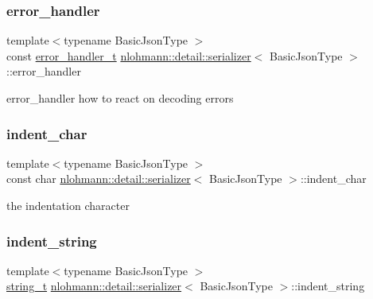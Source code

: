 \subsubsection{\texorpdfstring{error\_handler}{error\_handler}}
{\footnotesize\ttfamily template$<$typename Basic\+Json\+Type $>$ \\
const \mbox{\hyperlink{namespacenlohmann_1_1detail_a5a76b60b26dc8c47256a996d18d967df}{error\+\_\+handler\+\_\+t}} \mbox{\hyperlink{classnlohmann_1_1detail_1_1serializer}{nlohmann\+::detail\+::serializer}}$<$ Basic\+Json\+Type $>$\+::error\+\_\+handler\hspace{0.3cm}{\ttfamily [private]}}



error\+\_\+handler how to react on decoding errors 

\mbox{\label{classnlohmann_1_1detail_1_1serializer_a9a55e6b028d09676fe35aefa0c72ea5b}} 
\subsubsection{\texorpdfstring{indent\_char}{indent\_char}}
{\footnotesize\ttfamily template$<$typename Basic\+Json\+Type $>$ \\
const char \mbox{\hyperlink{classnlohmann_1_1detail_1_1serializer}{nlohmann\+::detail\+::serializer}}$<$ Basic\+Json\+Type $>$\+::indent\+\_\+char\hspace{0.3cm}{\ttfamily [private]}}



the indentation character 

\mbox{\label{classnlohmann_1_1detail_1_1serializer_ae9268a10d88a5526e32735a55a132fc6}} 
\subsubsection{\texorpdfstring{indent\_string}{indent\_string}}
{\footnotesize\ttfamily template$<$typename Basic\+Json\+Type $>$ \\
\mbox{\hyperlink{classnlohmann_1_1detail_1_1serializer_ad08aa54fac1dd0a453320c54137d45ba}{string\+\_\+t}} \mbox{\hyperlink{classnlohmann_1_1detail_1_1serializer}{nlohmann\+::detail\+::serializer}}$<$ Basic\+Json\+Type $>$\+::indent\+\_\+string\hspace{0.3cm}{\ttfamily [private]}}



